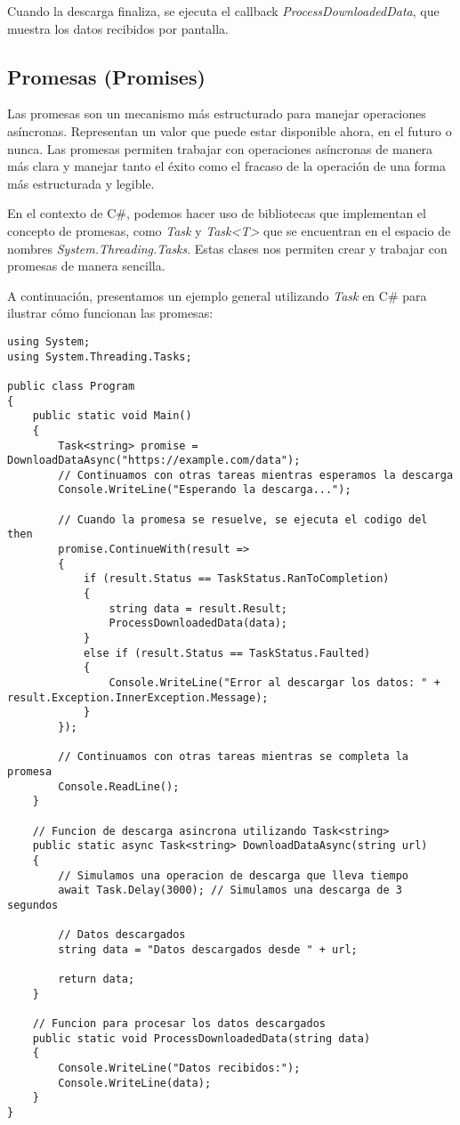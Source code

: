 \documentclass[executivepaper]{article}
\begin{document}
Cuando la descarga finaliza, se ejecuta el callback \emph{ProcessDownloadedData}, que muestra los datos recibidos por pantalla.

\subsection{Promesas (Promises)}

Las promesas son un mecanismo más estructurado para manejar operaciones asíncronas. Representan un valor que puede estar disponible ahora, en el futuro o nunca. Las promesas permiten trabajar con operaciones asíncronas de manera más clara y manejar tanto el éxito como el fracaso de la operación de una forma más estructurada y legible.

En el contexto de C\#, podemos hacer uso de bibliotecas que implementan el concepto de promesas, como \emph{Task} y \emph{Task<T>} que se encuentran en el espacio de nombres \emph{System.Threading.Tasks}. Estas clases nos permiten crear y trabajar con promesas de manera sencilla.

A continuación, presentamos un ejemplo general utilizando \emph{Task} en C\# para ilustrar cómo funcionan las promesas:

\begin{lstlisting}
using System;
using System.Threading.Tasks;

public class Program
{
    public static void Main()
    {
        Task<string> promise = DownloadDataAsync("https://example.com/data");
        // Continuamos con otras tareas mientras esperamos la descarga
        Console.WriteLine("Esperando la descarga...");
    
        // Cuando la promesa se resuelve, se ejecuta el codigo del then
        promise.ContinueWith(result =>
        {
            if (result.Status == TaskStatus.RanToCompletion)
            {
                string data = result.Result;
                ProcessDownloadedData(data);
            }
            else if (result.Status == TaskStatus.Faulted)
            {
                Console.WriteLine("Error al descargar los datos: " + result.Exception.InnerException.Message);
            }
        });
    
        // Continuamos con otras tareas mientras se completa la promesa
        Console.ReadLine();
    }
    
    // Funcion de descarga asincrona utilizando Task<string>
    public static async Task<string> DownloadDataAsync(string url)
    {
        // Simulamos una operacion de descarga que lleva tiempo
        await Task.Delay(3000); // Simulamos una descarga de 3 segundos
    
        // Datos descargados
        string data = "Datos descargados desde " + url;
    
        return data;
    }
    
    // Funcion para procesar los datos descargados
    public static void ProcessDownloadedData(string data)
    {
        Console.WriteLine("Datos recibidos:");
        Console.WriteLine(data);
    }
}
\end{lstlisting}
\end{document}

